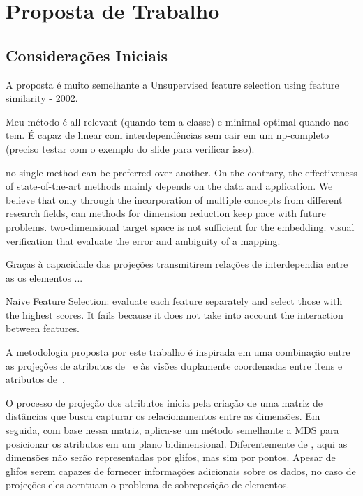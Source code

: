 \chapter{Proposta de Trabalho}\label{chap:proposta}

\section{Considerações Iniciais}

A proposta é muito semelhante a Unsupervised feature selection using feature similarity - 2002.

Meu método é all-relevant (quando tem a classe) e minimal-optimal quando nao tem. É capaz de linear com interdependências sem cair em um np-completo (preciso testar com o exemplo do slide para verificar isso).

\cite{Engel2012} no single method can be preferred over another. On the contrary, the effectiveness of state-of-the-art methods mainly depends on the data and application. 
We believe that only through the incorporation of multiple concepts from different research fields, can methods for dimension reduction keep pace with future problems. two-dimensional target space is not sufficient for the embedding. visual verification that evaluate the error and ambiguity of a mapping.

Graças à capacidade das projeções transmitirem relações de interdependia entre as os elementos ... 

Naive Feature Selection: evaluate each feature separately and select those with the highest scores. It fails because it does not take into account the interaction between features.

A metodologia proposta por este trabalho é inspirada em uma combinação entre as projeções de atributos de~\cite{Yang2004} e às visões duplamente coordenadas entre itens e atributos de~\cite{Turkay2011}. 

O processo de projeção dos atributos inicia pela criação de uma matriz de distâncias que busca capturar os relacionamentos entre as dimensões. Em seguida, com base nessa matriz, aplica-se um método semelhante a MDS para posicionar os atributos em um plano bidimensional. Diferentemente de \cite{Yang2004}, aqui as dimensões não serão representadas por glifos, mas sim por pontos. Apesar de glifos serem capazes de fornecer informações adicionais sobre os dados, no caso de projeções eles acentuam o problema de sobreposição de elementos.

